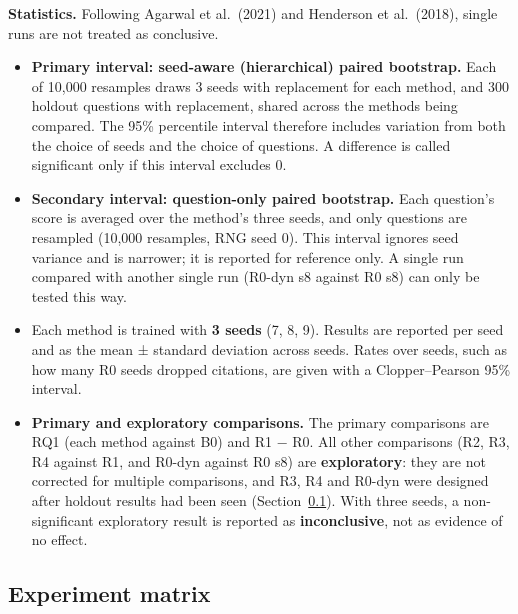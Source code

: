 \textbf{Statistics.} Following Agarwal et al.~(2021) and Henderson et
al.~(2018), single runs are not treated as conclusive.

\begin{itemize}
\tightlist
\item
  \textbf{Primary interval: seed-aware (hierarchical) paired bootstrap.}
  Each of 10,000 resamples draws 3 seeds with replacement for each
  method, and 300 holdout questions with replacement, shared across the
  methods being compared. The 95\% percentile interval therefore
  includes variation from both the choice of seeds and the choice of
  questions. A difference is called significant only if this interval
  excludes 0.
\item
  \textbf{Secondary interval: question-only paired bootstrap.} Each
  question's score is averaged over the method's three seeds, and only
  questions are resampled (10,000 resamples, RNG seed 0). This interval
  ignores seed variance and is narrower; it is reported for reference
  only. A single run compared with another single run (R0-dyn s8 against
  R0 s8) can only be tested this way.
\item
  Each method is trained with \textbf{3 seeds} (7, 8, 9). Results are
  reported per seed and as the mean ± standard deviation across seeds.
  Rates over seeds, such as how many R0 seeds dropped citations, are
  given with a Clopper--Pearson 95\% interval.
\item
  \textbf{Primary and exploratory comparisons.} The primary comparisons
  are RQ1 (each method against B0) and R1 − R0. All other comparisons
  (R2, R3, R4 against R1, and R0-dyn against R0 s8) are
  \textbf{exploratory}: they are not corrected for multiple comparisons,
  and R3, R4 and R0-dyn were designed after holdout results had been
  seen (Section~\ref{sec:3.8}). With three seeds, a non-significant
  exploratory result is reported as \textbf{inconclusive}, not as
  evidence of no effect.
\end{itemize}

\subsection{Experiment matrix}\label{sec:3.8}

